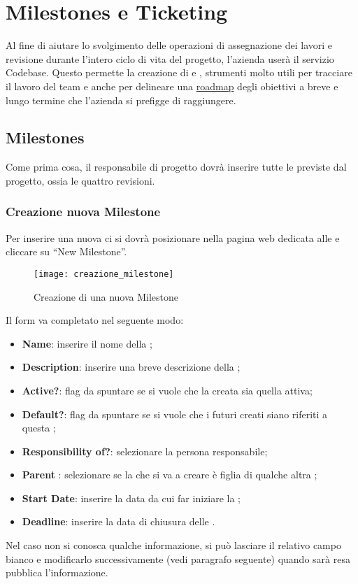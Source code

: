 \newpage
\section{Milestones e Ticketing}
Al fine di aiutare lo svolgimento delle operazioni di assegnazione dei lavori e revisione durante l'intero ciclo di vita del progetto, l'azienda \team{} userà il servizio Codebase. Questo permette la creazione di  e \underline{}, strumenti molto utili per tracciare il lavoro del team e anche per delineare una \underline{roadmap} degli obiettivi a breve e lungo termine che l'azienda si prefigge di raggiungere.

\subsection{Milestones}
Come prima cosa, il responsabile di progetto dovrà inserire tutte le  previste dal progetto, ossia le quattro revisioni.
\subsubsection{Creazione nuova Milestone}
\label{sec:creazione_milestone}
Per inserire una nuova  ci si dovrà posizionare nella pagina web dedicata alle  e cliccare su ``New Milestone''.
\begin{figure}[h]
\texttt{[image: creazione\_milestone]}
\caption{Creazione di una nuova Milestone} \label{fig:creazione_milestone}
\end{figure}
Il form va completato nel seguente modo:
\begin{itemize}
\item \textbf{Name}: inserire il nome della ;
\item \textbf{Description}: inserire una breve descrizione della ;
\item \textbf{Active?}: flag da spuntare se si vuole che la  creata sia quella attiva;
\item \textbf{Default?}: flag da spuntare se si vuole che i futuri  creati siano riferiti a questa ;
\item \textbf{Responsibility of?}: selezionare la persona responsabile;
\item \textbf{Parent }: selezionare se la  che si va a creare è figlia di qualche altra ;
\item \textbf{Start Date}: inserire la data da cui far iniziare la ;
\item \textbf{Deadline}: inserire la data di chiusura delle .
\end{itemize}
Nel caso non si conosca qualche informazione, si può lasciare il relativo campo bianco e modificarlo successivamente (vedi paragrafo seguente) quando sarà resa pubblica l'informazione.

